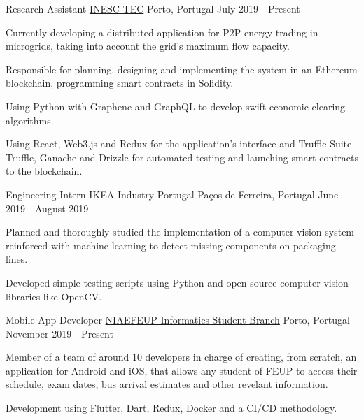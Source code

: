 
\begin{cventries}
  \cventry
    {Research Assistant} %
    {\href{https://www.inesctec.pt/en}{INESC-TEC}} %
    {Porto, Portugal} %
    {July 2019 - Present} %
    {
      \begin{cvitems} %
        \item {Currently developing a distributed application for P2P energy trading in microgrids, taking into account the grid's maximum flow capacity.}
        \item {Responsible for planning, designing and implementing the system in an Ethereum blockchain, programming smart contracts in Solidity.}
        \item {Using Python with Graphene and GraphQL to develop swift economic clearing algorithms.}
        \item {Using React, Web3.js and Redux for the application's interface and Truffle Suite - Truffle, Ganache and Drizzle for automated testing and launching smart contracts to the blockchain.}
      \end{cvitems}
    }

  \cventry
    {Engineering Intern} %
    {IKEA Industry Portugal} %
    {Paços de Ferreira, Portugal} %
    {June 2019 - August 2019} %
    {
      \begin{cvitems} %
        \item {Planned and thoroughly studied the implementation of a computer vision system reinforced with machine learning to detect missing components on packaging lines.}
        \item {Developed simple testing scripts using Python and open source computer vision libraries like OpenCV.}
      \end{cvitems}
    }

  \cventry
    {Mobile App Developer} %
    {\href{https://ni.fe.up.pt}{NIAEFEUP Informatics Student Branch}} %
    {Porto, Portugal} %
    {November 2019 - Present} %
    {
      \begin{cvitems} %
        \item {Member of a team of around 10 developers in charge of creating, from scratch, an application for Android and iOS, that allows any student of FEUP to access their schedule, exam dates, bus arrival estimates and other revelant information.}
        \item{Development using Flutter, Dart, Redux, Docker and a CI/CD methodology.}
      \end{cvitems}
    }
   
\end{cventries}
